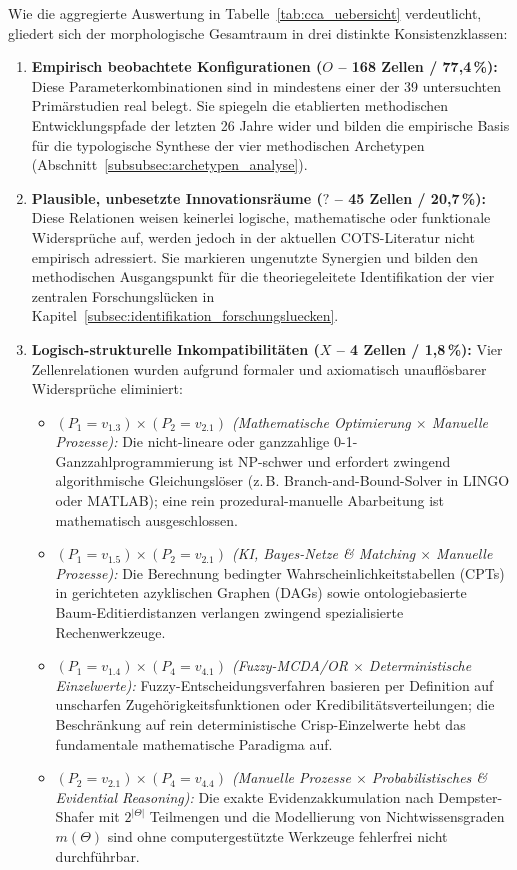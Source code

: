 Wie die aggregierte Auswertung in Tabelle~\ref{tab:cca_uebersicht} verdeutlicht, gliedert sich der morphologische Gesamtraum in drei distinkte Konsistenzklassen:
\begin{enumerate}[label=\textbf{\alph*)}, leftmargin=*]
  \item \textbf{Empirisch beobachtete Konfigurationen ($O$ -- 168 Zellen / 77,4\,\%):} Diese Parameterkombinationen sind in mindestens einer der 39 untersuchten Primärstudien real belegt. Sie spiegeln die etablierten methodischen Entwicklungspfade der letzten 26 Jahre wider und bilden die empirische Basis für die typologische Synthese der vier methodischen Archetypen (Abschnitt~\ref{subsubsec:archetypen_analyse}).
  \item \textbf{Plausible, unbesetzte Innovationsräume ($?$ -- 45 Zellen / 20,7\,\%):} Diese Relationen weisen keinerlei logische, mathematische oder funktionale Widersprüche auf, werden jedoch in der aktuellen COTS-Literatur nicht empirisch adressiert. Sie markieren ungenutzte Synergien und bilden den methodischen Ausgangspunkt für die theoriegeleitete Identifikation der vier zentralen Forschungslücken in Kapitel~\ref{subsec:identifikation_forschungsluecken}.
  \item \textbf{Logisch-strukturelle Inkompatibilitäten ($X$ -- 4 Zellen / 1,8\,\%):} Vier Zellenrelationen wurden aufgrund formaler und axiomatisch unauflösbarer Widersprüche eliminiert:
  \begin{itemize}[leftmargin=*]
    \item \textit{$(P_1 = v_{1.3}) \times (P_2 = v_{2.1})$ (Mathematische Optimierung $\times$ Manuelle Prozesse):} Die nicht-lineare oder ganzzahlige 0-1-Ganzzahlprogrammierung ist NP-schwer und erfordert zwingend algorithmische Gleichungslöser (z.\,B. Branch-and-Bound-Solver in LINGO oder MATLAB); eine rein prozedural-manuelle Abarbeitung ist mathematisch ausgeschlossen.
    \item \textit{$(P_1 = v_{1.5}) \times (P_2 = v_{2.1})$ (KI, Bayes-Netze \& Matching $\times$ Manuelle Prozesse):} Die Berechnung bedingter Wahrscheinlichkeitstabellen (CPTs) in gerichteten azyklischen Graphen (DAGs) sowie ontologiebasierte Baum-Editierdistanzen verlangen zwingend spezialisierte Rechenwerkzeuge.
    \item \textit{$(P_1 = v_{1.4}) \times (P_4 = v_{4.1})$ (Fuzzy-MCDA/OR $\times$ Deterministische Einzelwerte):} Fuzzy-Entscheidungsverfahren basieren per Definition auf unscharfen Zugehörigkeitsfunktionen oder Kredibilitätsverteilungen; die Beschränkung auf rein deterministische Crisp-Einzelwerte hebt das fundamentale mathematische Paradigma auf.
    \item \textit{$(P_2 = v_{2.1}) \times (P_4 = v_{4.4})$ (Manuelle Prozesse $\times$ Probabilistisches \& Evidential Reasoning):} Die exakte Evidenzakkumulation nach Dempster-Shafer mit $2^{|\Theta|}$ Teilmengen und die Modellierung von Nichtwissensgraden $m(\Theta)$ sind ohne computergestützte Werkzeuge fehlerfrei nicht durchführbar.
  \end{itemize}
\end{enumerate}

